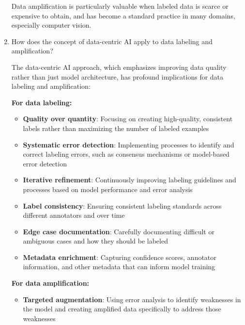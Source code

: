 \documentclass[12pt]{article}
\begin{document}
\begin{enumerate}
\begin{tcolorbox}[colback=blue!5!white,colframe=blue!75!black,title={Solution}]
    Data amplification is particularly valuable when labeled data is scarce or expensive to obtain, and has become a standard practice in many domains, especially computer vision.
    \end{tcolorbox}
    
    \item How does the concept of data-centric AI apply to data labeling and amplification?
    
    \begin{tcolorbox}[colback=blue!5!white,colframe=blue!75!black,title={Solution}]
    The data-centric AI approach, which emphasizes improving data quality rather than just model architecture, has profound implications for data labeling and amplification:
    
    \textbf{For data labeling:}
    \begin{itemize}
        \item \textbf{Quality over quantity}: Focusing on creating high-quality, consistent labels rather than maximizing the number of labeled examples
        
        \item \textbf{Systematic error detection}: Implementing processes to identify and correct labeling errors, such as consensus mechanisms or model-based error detection
        
        \item \textbf{Iterative refinement}: Continuously improving labeling guidelines and processes based on model performance and error analysis
        
        \item \textbf{Label consistency}: Ensuring consistent labeling standards across different annotators and over time
        
        \item \textbf{Edge case documentation}: Carefully documenting difficult or ambiguous cases and how they should be labeled
        
        \item \textbf{Metadata enrichment}: Capturing confidence scores, annotator information, and other metadata that can inform model training
    \end{itemize}
    
    \textbf{For data amplification:}
    \begin{itemize}
        \item \textbf{Targeted augmentation}: Using error analysis to identify weaknesses in the model and creating amplified data specifically to address those weaknesses
        

\end{itemize}
\end{tcolorbox}
\end{enumerate}
\end{document}
